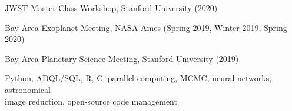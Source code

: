 \documentclass[12pt,letterpaper]{article}
\begin{document}
\begin{list}{}{\cvlist}
\item JWST Master Class Workshop, Stanford University (2020)
\item Bay Area Exoplanet Meeting, NASA Ames (Spring 2019, Winter 2019, Spring 2020)
\item Bay Area Planetary Science Meeting, Stanford University (2019)
\end{list}

\begin{list}{}{\cvlist}
\item Python, ADQL/SQL, R, C, parallel computing, MCMC, neural networks, astronomical \\ image reduction, open-source code management
\end{list}
\end{document}
